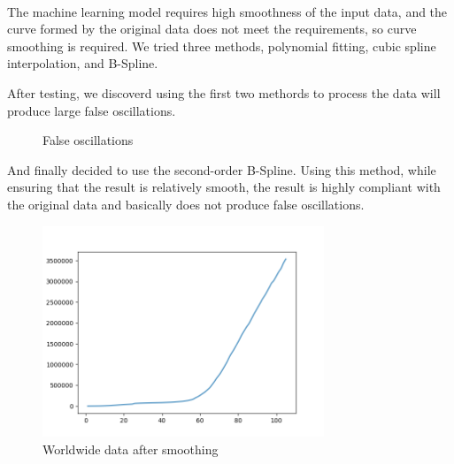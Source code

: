\documentclass[]{article}
\begin{document}
\paragraph{}
The machine learning model requires high smoothness of the input data, 
and the curve formed by the original data does not meet the requirements, 
so curve smoothing is required.
We tried three methods, polynomial fitting, cubic spline interpolation,
and B-Spline.
\par
After testing, we discoverd using the first two methords to process
the data will produce large false oscillations.
\begin{figure}[H]
    \centering
	\caption{False oscillations}
\end{figure}
\par
And finally decided to use the second-order B-Spline.
Using this method, 
while ensuring that the result is relatively smooth, 
the result is highly compliant with the original data 
and basically does not produce false oscillations.
\begin{figure}[H]
    \centering
    \includegraphics[width = 0.75\textwidth]{Worldwide.png}
    \caption{Worldwide data after smoothing}
\end{figure}
\end{document}
